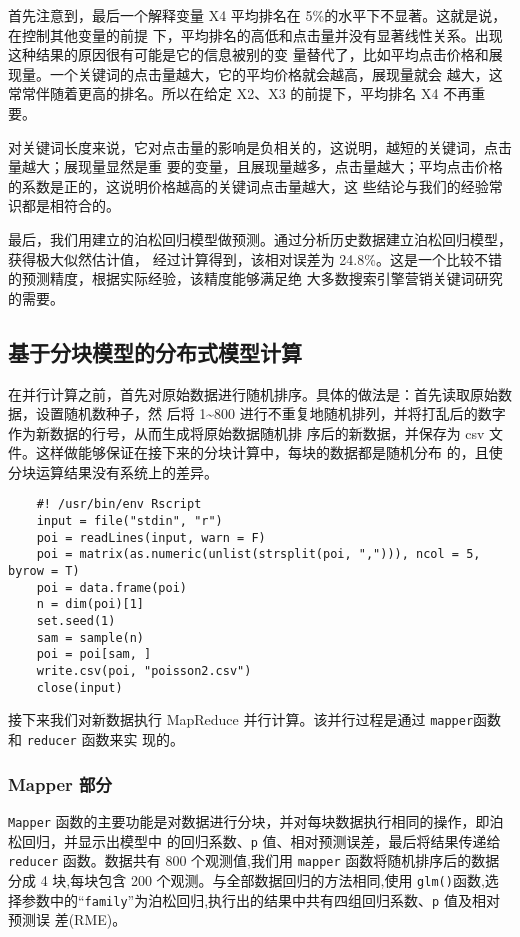 首先注意到，最后一个解释变量 X4 平均排名在
5\%的水平下不显著。这就是说，在控制其他变量的前提
下，平均排名的高低和点击量并没有显著线性关系。出现这种结果的原因很有可能是它的信息被别的变
量替代了，比如平均点击价格和展现量。一个关键词的点击量越大，它的平均价格就会越高，展现量就会
越大，这常常伴随着更高的排名。所以在给定 X2、X3 的前提下，平均排名 X4
不再重要。

对关键词长度来说，它对点击量的影响是负相关的，这说明，越短的关键词，点击量越大；展现量显然是重
要的变量，且展现量越多，点击量越大；平均点击价格的系数是正的，这说明价格越高的关键词点击量越大，这
些结论与我们的经验常识都是相符合的。

最后，我们用建立的泊松回归模型做预测。通过分析历史数据建立泊松回归模型，获得极大似然估计值，
经过计算得到，该相对误差为
24.8\%。这是一个比较不错的预测精度，根据实际经验，该精度能够满足绝
大多数搜索引擎营销关键词研究的需要。

\subsection{基于分块模型的分布式模型计算}\label{ux57faux4e8eux5206ux5757ux6a21ux578bux7684ux5206ux5e03ux5f0fux6a21ux578bux8ba1ux7b97}

在并行计算之前，首先对原始数据进行随机排序。具体的做法是：首先读取原始数据，设置随机数种子，然
后将 1\textasciitilde{}800
进行不重复地随机排列，并将打乱后的数字作为新数据的行号，从而生成将原始数据随机排
序后的新数据，并保存为 csv
文件。这样做能够保证在接下来的分块计算中，每块的数据都是随机分布
的，且使分块运算结果没有系统上的差异。

\begin{lstlisting}
	#! /usr/bin/env Rscript
	input = file("stdin", "r")
	poi = readLines(input, warn = F)
	poi = matrix(as.numeric(unlist(strsplit(poi, ","))), ncol = 5, byrow = T)
	poi = data.frame(poi)
	n = dim(poi)[1]
	set.seed(1)
	sam = sample(n)
	poi = poi[sam, ]
	write.csv(poi, "poisson2.csv")
	close(input)
\end{lstlisting}

接下来我们对新数据执行 MapReduce 并行计算。该并行过程是通过 \lstinline!mapper!函数和
\lstinline!reducer! 函数来实 现的。

\subsubsection{Mapper 部分}\label{mapper-ux90e8ux5206}

\lstinline!Mapper!
函数的主要功能是对数据进行分块，并对每块数据执行相同的操作，即泊松回归，并显示出模型中
的回归系数、\lstinline!p! 值、相对预测误差，最后将结果传递给 \lstinline!reducer! 函数。数据共有
800 个观测值,我们用 \lstinline!mapper! 函数将随机排序后的数据分成 4 块,每块包含 200
个观测。与全部数据回归的方法相同,使用
\lstinline!glm()!函数,选择参数中的``\lstinline!family!''为泊松回归,执行出的结果中共有四组回归系数、\lstinline!p!
值及相对预测误 差(RME)。

